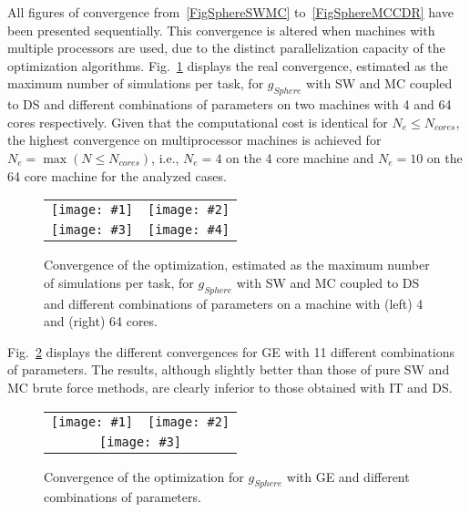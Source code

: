 \documentclass[review,authoryear]{elsarticle}
\newcommand{\FIGIII}[5]
{
	\begin{figure}[ht!]
		\centering
		\begin{tabular}{cc}
			\texttt{[image: \#1]} & \texttt{[image: \#2]} \\
			\multicolumn{2}{c}{\texttt{[image: \#3]}}
		\end{tabular}
		\caption{#4.\label{#5}}
	\end{figure}
}
\newcommand{\FIGIV}[6]
{
	\begin{figure}[ht!]
		\centering
		\begin{tabular}{cc}
			\texttt{[image: \#1]} & \texttt{[image: \#2]} \\
			\texttt{[image: \#3]} & \texttt{[image: \#4]}
		\end{tabular}
		\caption{#5.\label{#6}}
	\end{figure}
}
\newcommand{\PA}[1]{\left(#1\right)}
\begin{document}
All figures of convergence from~\ref{FigSphereSWMC} to~\ref{FigSphereMCCDR}
have been presented sequentially. This convergence is altered when machines with 
multiple processors are used, due to the distinct parallelization capacity of the 
optimization algorithms. Fig.~\ref{FigSphereSWMCDS} displays the real convergence,
estimated as the maximum number of simulations per task, for $g_{Sphere}$ with SW 
and MC coupled to DS and different combinations of parameters on two machines with 4 
and 64 cores respectively. Given that the computational cost is identical for 
$N_e\leq N_{cores}$, the highest convergence on multiprocessor machines is achieved
for $N_e=\max\PA{N\leq N_{cores}}$, i.e., $N_e=4$ on the 4 core machine and $N_e=10$
on the 64 core machine for the analyzed cases.
\FIGIV{sphere-task-1-4.eps}{sphere-task-1-64.eps}
{sphere-task-2-4.eps}{sphere-task-2-64.eps}
{Convergence of the optimization, estimated as the maximum number of simulations
per task, for $g_{Sphere}$ with SW and MC coupled to DS and different
combinations of parameters on a machine with (left) 4 and (right) 64 cores}
{FigSphereSWMCDS}

Fig.~\ref{FigSphereGE} displays the different convergences for GE with 11
different combinations of parameters. The results, although slightly better than
those of pure SW and MC brute force methods, are clearly inferior to those
obtained with IT and DS. 
\FIGIII{sphere-evolution-ge-1-4.eps}{sphere-evolution-ge-5-8.eps}
{sphere-evolution-ge-9-11.eps}{Convergence of the optimization for $g_{Sphere}$
with GE and different combinations of parameters}{FigSphereGE}
\end{document}
